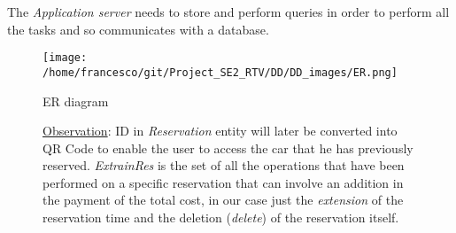 \documentclass[10pt, a4paper,titlepage]{article}
\begin{document}
The \emph{Application server} needs to store and perform queries in order to perform all the tasks and so communicates with a database.
\clearpage
\begin{figure}[h]
\begin{center}
\texttt{[image: /home/francesco/git/Project\_SE2\_RTV/DD/DD\_images/ER.png]}
\end{center}
\caption{ER diagram}
\caption*{\underline{Observation}: ID in \emph{Reservation} entity will later be converted into QR Code to enable the user to access the car that he has previously reserved. \emph{ExtrainRes} is the set of all the operations that have been performed on a specific reservation that can involve an addition in the payment of the total cost, in our case just the \emph{extension} of the reservation time and the deletion (\emph{delete}) of the reservation itself.}
\label{fig:ER}
\end{figure}
\clearpage
\end{document}

